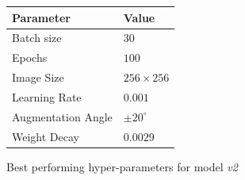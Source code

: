 

\begin{margintable}
\begin{tabular}{@{}ll@{}}
\toprule
\textbf{Parameter} & \textbf{Value}   \\ \midrule
Batch size         & $30$             \\
Epochs             & $100$            \\
Image Size         & $256 \times 256$ \\
Learning Rate      & $0.001$            \\
Augmentation Angle & $\pm 20^{\circ}$ \\
Weight Decay       & $0.0029$         \\ \bottomrule
\end{tabular}
\caption{Best performing hyper-parameters for model \emph{v2}}\label{tab:hyperparam_rest}
\end{margintable}


